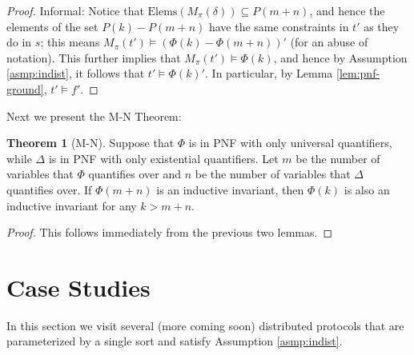 \documentclass[12pt]{article}
\theoremstyle{definition}
\newtheorem{theorem}{Theorem}
\theoremstyle{remark}
\newcommand{\gr}{\text{Gr}}
\newcommand{\elems}{\text{Elems}}
\begin{document}
\begin{proof}
  Informal: 
  Notice that $\elems(M_\pi(\delta)) \subseteq P(m+n)$, and hence the elements of the set $P(k) - P(m+n)$ have the same constraints in $t'$ as they do in $s$; this means $M_\pi(t') \models (\Phi(k) - \Phi(m+n))'$ (for an abuse of notation).  This further implies that $M_\pi(t') \models \Phi(k)$, and hence by Assumption \ref{asmp:indist}, it follows that $t' \models \Phi(k)'$.  In particular, by Lemma \ref{lem:pnf-ground}, $t' \models f'$.

\end{proof}

Next we present the M-N Theorem:

\begin{theorem}[M-N]
  Suppose that $\Phi$ is in PNF with only universal quantifiers, while $\Delta$ is in PNF with only existential quantifiers.  Let $m$ be the number of variables that $\Phi$ quantifies over and $n$ be the number of variables that $\Delta$ quantifies over.  If $\Phi(m+n)$ is an inductive invariant, then $\Phi(k)$ is also an inductive invariant for any $k>m+n$.
\end{theorem}
\begin{proof}
  This follows immediately from the previous two lemmas.
\end{proof}



\section{Case Studies}
In this section we visit several (more coming soon) distributed protocols that are parameterized by a single sort and satisfy Assumption \ref{asmp:indist}.
\end{document}
